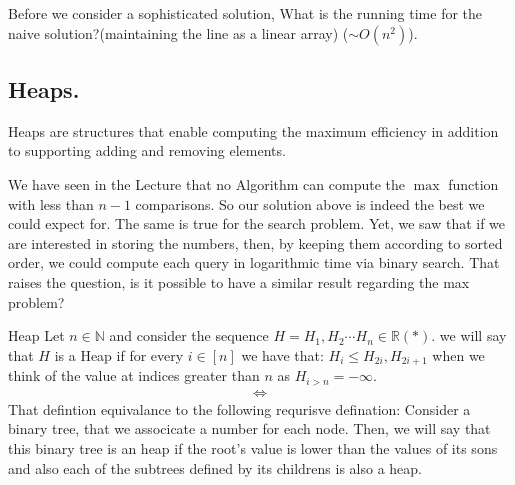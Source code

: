 Before we consider a sophisticated solution, What is the running time for the naive solution?(maintaining the line as a linear array) ($\sim O\left( n^2 \right)$).  
\subsection*{Heaps.} Heaps are structures that enable computing the maximum efficiency in addition to supporting adding and removing elements.

We have seen in the Lecture that no Algorithm can compute the $\max$ function with less than $n-1$ comparisons. So our solution above is indeed the best we could expect for. The same is true for the search problem. Yet, we saw that if we are interested in storing the numbers, then, by keeping them according to sorted order, we could compute each query in logarithmic time via binary search. That raises the question, is it possible to have a similar result regarding the max problem?

\begin{defbox}{Heap}
  Let $n \in \mathbb{N}$ and consider the sequence $H = H_{1}, H_{2} \cdots H_{n} \in \mathbb{R} \left( * \right)$. we will say that $H$ is a Heap if for every $i \in [n]$ we have that: $H_{i} \le H_{2i}, H_{2i + 1}$ when we think of the value at indices greater than $n$ as $H_{i>n} = -\infty$. 
  \begin{equation*}
    \begin{split}
      \Leftrightarrow
    \end{split}
  \end{equation*}
  That defintion equivalance to the following requrisve defination: Consider a binary tree, that we associcate a number for each node. Then, we will say that this binary tree is an heap if the root's value is lower than the values of its sons and also each of the subtrees defined by its childrens is also a heap. 
\end{defbox}


